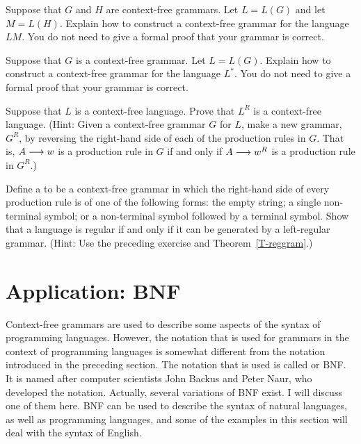 \begin{exercises}
\problem Suppose that $G$ and $H$ are context-free grammars.
Let $L=L(G)$ and let $M=L(H)$.  Explain how to construct
a context-free grammar for the language $LM$.  You do not
need to give a formal proof that your grammar is correct.

\problem Suppose that $G$ is a context-free grammar.
Let $L=L(G)$.  Explain how to construct
a context-free grammar for the language $L^*$.  You do not
need to give a formal proof that your grammar is correct.

\problem Suppose that $L$ is a context-free language.
Prove that $L^R$ is a context-free language.  (Hint:
Given a context-free grammar $G$ for $L$, make a new grammar, $G^R$,
by reversing the right-hand side of each of the production
rules in $G$.  That is, $A\longrightarrow w$ is a production rule in
$G$ if and only if $A\longrightarrow w^R$ is a production rule in $G^R$.)

\problem Define a 
to be a context-free grammar in which the right-hand side of
every production rule is of one of the following forms:
the empty string; a single non-terminal symbol; or a non-terminal
symbol followed by a terminal symbol.  Show that a language is
regular if and only if it can be generated by a left-regular
grammar.  (Hint: Use the preceding exercise and Theorem~\ref{T-reggram}.)




\end{exercises}


\section{Application: BNF}\label{S-grammars-2}

Context-free grammars are used to describe some aspects of
the syntax of programming languages.  However, the notation
that is used for grammars in the context of programming languages
is somewhat different from the notation introduced in the
preceding section.  The notation that is used is called
 or BNF.  It is named after computer
scientists John Backus and Peter Naur, who developed the
notation.  Actually, several variations of BNF exist.
I will discuss one of them here.  BNF can be used to describe
the syntax of natural languages, as well as programming languages,
and some of the examples in this section will deal with the
syntax of English.

